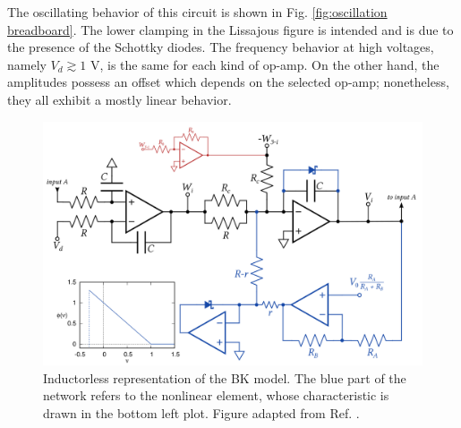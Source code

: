 The oscillating behavior of this circuit is shown in Fig.
\ref{fig:oscillation breadboard}. The lower clamping in the Lissajous
figure is intended and is due to the presence of the Schottky diodes.
The frequency behavior at high voltages,
namely $V_d \gtrsim 1$ V, is the same for each kind of op-amp.
On the other hand, the amplitudes possess an offset which depends on
the selected op-amp; nonetheless, they all exhibit a mostly linear
behavior.

\begin{figure}[H]
    \centering
    \includegraphics[width=\linewidth]
    {../1_block/breadboard/breadboard_implementation.png}
    \caption{Inductorless representation of the BK model.
    The blue part of the network refers to the nonlinear element,
    whose characteristic is drawn in the bottom left plot.
    Figure adapted from Ref. \cite{main_paper}.}\label{fig:breadboard implementation}
\end{figure}


